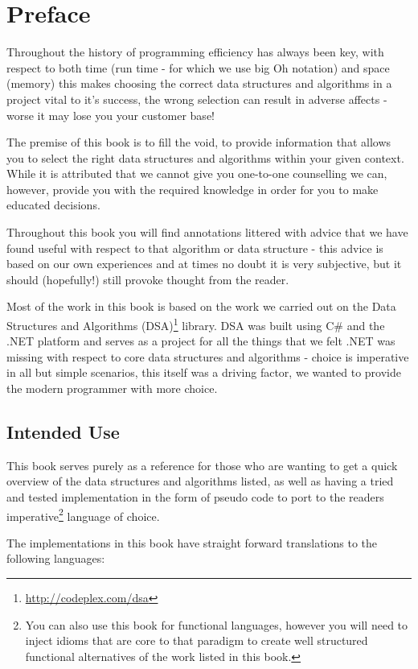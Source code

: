 \chapter{Preface}
Throughout the history of programming efficiency has always been key, with respect to both time (run time - for which we use big Oh notation) and space (memory) this makes choosing the correct data structures and algorithms in a project vital to it's success, the wrong selection can result in adverse affects - worse it may lose you your customer base!

The premise of this book is to fill the void, to provide information that allows you to select the right data structures and algorithms within your given context. While it is attributed that we cannot give you one-to-one counselling we can, however, provide you with the required knowledge in order for you to make educated decisions.

Throughout this book you will find annotations littered with advice that we have found useful with respect to that algorithm or data structure - this advice is based on our own experiences and at times no doubt it is very subjective, but it should (hopefully!) still provoke thought from the reader.

Most of the work in this book is based on the work we carried out on the Data Structures and Algorithms (DSA)\footnote{\url{http://codeplex.com/dsa}} library. DSA was built using C\# and the .NET platform and serves as a project for all the things that we felt .NET was missing with respect to core data structures and algorithms - choice is imperative in all but simple scenarios, this itself was a driving factor, we wanted to provide the modern programmer with more choice.

\section*{Intended Use}
This book serves purely as a reference for those who are wanting to get a quick overview of the data structures and algorithms listed, as well as having a tried and tested implementation in the form of pseudo code to port to the readers imperative\footnote{You can also use this book for functional languages, however you will need to inject idioms that are core to that paradigm to create well structured functional alternatives of the work listed in this book.} language of choice.

The implementations in this book have straight forward translations to the following languages:

